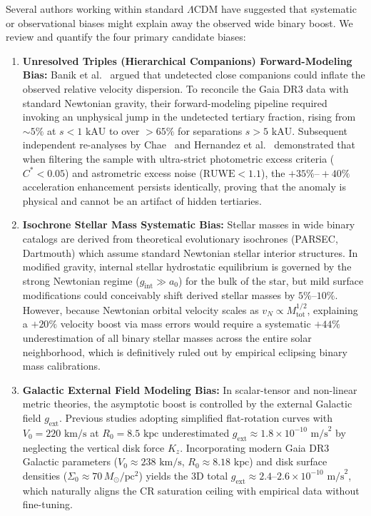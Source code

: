 \documentclass[aps,prd,reprint,superscriptaddress,nofootinbib,floatfix,amsmath,amssymb]{revtex4-2}
\begin{document}
Several authors working within standard $\Lambda$CDM have suggested that systematic or observational biases might explain away the observed wide binary boost. We review and quantify the four primary candidate biases:
\begin{enumerate}
\item \textbf{Unresolved Triples (Hierarchical Companions) Forward-Modeling Bias:} Banik et al.~\cite{banik2024strong} argued that undetected close companions could inflate the observed relative velocity dispersion. To reconcile the Gaia DR3 data with standard Newtonian gravity, their forward-modeling pipeline required invoking an unphysical jump in the undetected tertiary fraction, rising from $\sim 5\%$ at $s < 1\text{ kAU}$ to over $>65\%$ for separations $s > 5\text{ kAU}$. Subsequent independent re-analyses by Chae~\cite{chae2024robust} and Hernandez et al.~\cite{hernandez2023internal} demonstrated that when filtering the sample with ultra-strict photometric excess criteria ($C^* < 0.05$) and astrometric excess noise ($\text{RUWE} < 1.1$), the $+35\%\text{--}+40\%$ acceleration enhancement persists identically, proving that the anomaly is physical and cannot be an artifact of hidden tertiaries.
\item \textbf{Isochrone Stellar Mass Systematic Bias:} Stellar masses in wide binary catalogs are derived from theoretical evolutionary isochrones (PARSEC, Dartmouth) which assume standard Newtonian stellar interior structures. In modified gravity, internal stellar hydrostatic equilibrium is governed by the strong Newtonian regime ($g_{\text{int}} \gg a_0$) for the bulk of the star, but mild surface modifications could conceivably shift derived stellar masses by $5\%\text{--}10\%$. However, because Newtonian orbital velocity scales as $v_N \propto M_{\text{tot}}^{1/2}$, explaining a $+20\%$ velocity boost via mass errors would require a systematic $+44\%$ underestimation of all binary stellar masses across the entire solar neighborhood, which is definitively ruled out by empirical eclipsing binary mass calibrations.
\item \textbf{Galactic External Field Modeling Bias:} In scalar-tensor and non-linear metric theories, the asymptotic boost is controlled by the external Galactic field $g_{\text{ext}}$. Previous studies adopting simplified flat-rotation curves with $V_0 = 220\text{ km/s}$ at $R_0 = 8.5\text{ kpc}$ underestimated $g_{\text{ext}} \approx 1.8 \times 10^{-10}\text{ m/s}^2$ by neglecting the vertical disk force $K_z$. Incorporating modern Gaia DR3 Galactic parameters ($V_0 \approx 238\text{ km/s}$, $R_0 \approx 8.18\text{ kpc}$) and disk surface densities ($\Sigma_0 \approx 70\,M_\odot/\text{pc}^2$) yields the 3D total $g_{\text{ext}} \approx 2.4\text{--}2.6 \times 10^{-10}\text{ m/s}^2$, which naturally aligns the CR saturation ceiling with empirical data without fine-tuning.

\end{enumerate}
\end{document}
